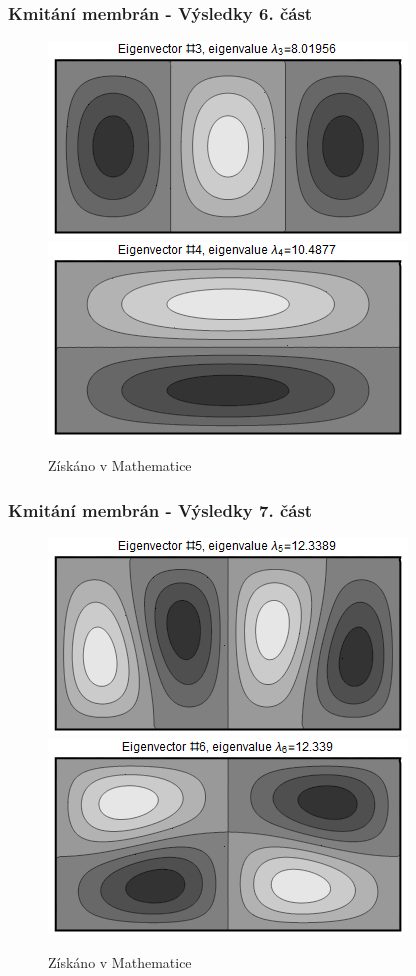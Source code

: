 \documentclass[xcolor=table]{beamer}
\begin{document}
\begin{frame}
\frametitle{Kmitání membrán - Výsledky 6. část}
\centering
\begin{figure}
\includegraphics[width=.6\linewidth]{rectangle-eigenvector-3.png}
\includegraphics[width=.6\linewidth]{rectangle-eigenvector-4.png}
\caption{Získáno v Mathematice}
\end{figure}
\end{frame}

\begin{frame}
\frametitle{Kmitání membrán - Výsledky 7. část}
\centering
\begin{figure}
\includegraphics[width=.6\linewidth]{rectangle-eigenvector-5.png}
\includegraphics[width=.6\linewidth]{rectangle-eigenvector-6.png}
\caption{Získáno v Mathematice}
\end{figure}
\end{frame}
\end{document}
